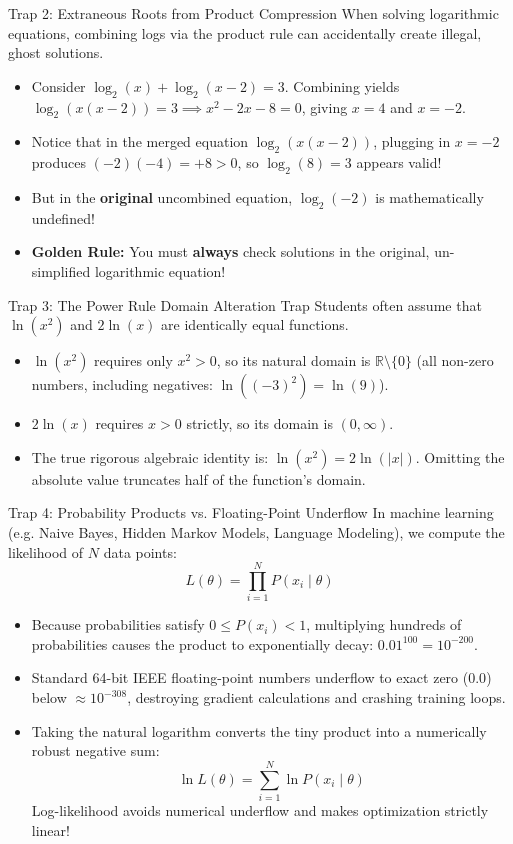 \begin{trapbox}{Trap 2: Extraneous Roots from Product Compression}
When solving logarithmic equations, combining logs via the product rule can accidentally create illegal, ghost solutions.
\begin{itemize}
    \item Consider $\log_2(x) + \log_2(x - 2) = 3$. Combining yields $\log_2(x(x - 2)) = 3 \implies x^2 - 2x - 8 = 0$, giving $x = 4$ and $x = -2$.
    \item Notice that in the merged equation $\log_2(x(x - 2))$, plugging in $x = -2$ produces $(-2)(-4) = +8 > 0$, so $\log_2(8) = 3$ appears valid!
    \item But in the \textbf{original} uncombined equation, $\log_2(-2)$ is mathematically undefined!
    \item \textbf{Golden Rule:} You must \textbf{always} check solutions in the original, un-simplified logarithmic equation!
\end{itemize}
\end{trapbox}

\begin{trapbox}{Trap 3: The Power Rule Domain Alteration Trap}
Students often assume that $\ln(x^2)$ and $2\ln(x)$ are identically equal functions.
\begin{itemize}
    \item $\ln(x^2)$ requires only $x^2 > 0$, so its natural domain is $\mathbb{R} \setminus \{0\}$ (all non-zero numbers, including negatives: $\ln((-3)^2) = \ln(9)$).
    \item $2\ln(x)$ requires $x > 0$ strictly, so its domain is $(0, \infty)$.
    \item The true rigorous algebraic identity is: $\ln(x^2) = 2\ln(|x|)$. Omitting the absolute value truncates half of the function's domain.
\end{itemize}
\end{trapbox}

\begin{trapbox}{Trap 4: Probability Products vs. Floating-Point Underflow}
In machine learning (e.g. Naive Bayes, Hidden Markov Models, Language Modeling), we compute the likelihood of $N$ data points:
$$L(\theta) = \prod_{i=1}^N P(x_i \mid \theta)$$
\begin{itemize}
    \item Because probabilities satisfy $0 \le P(x_i) < 1$, multiplying hundreds of probabilities causes the product to exponentially decay: $0.01^{100} = 10^{-200}$.
    \item Standard 64-bit IEEE floating-point numbers underflow to exact zero ($0.0$) below $\approx 10^{-308}$, destroying gradient calculations and crashing training loops.
    \item Taking the natural logarithm converts the tiny product into a numerically robust negative sum:
    $$\ln L(\theta) = \sum_{i=1}^N \ln P(x_i \mid \theta)$$
    Log-likelihood avoids numerical underflow and makes optimization strictly linear!
\end{itemize}
\end{trapbox}

